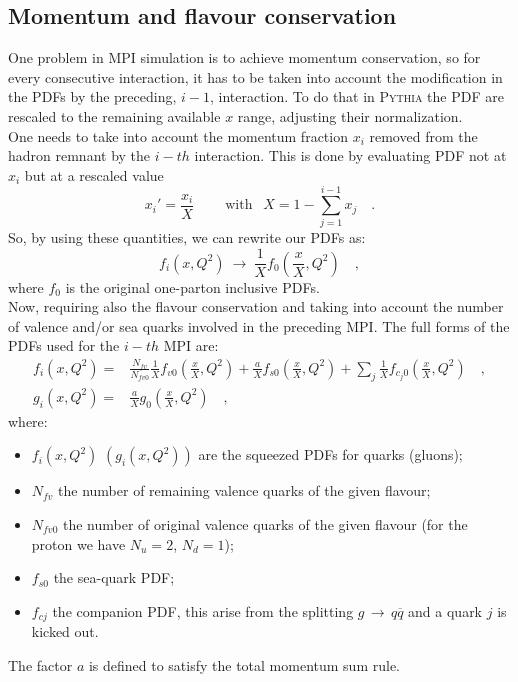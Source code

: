 \subsection{Momentum and flavour conservation}

One problem in MPI simulation is to achieve momentum conservation, so for every consecutive interaction, it has to be taken into account the modification in the PDFs by the preceding, $i-1$, interaction. To do that in \textsc{Pythia} the PDF are rescaled to the remaining available $x$ range, adjusting their normalization.
\\
One needs to take into account the momentum fraction $x_i$ removed from the hadron remnant by the $i-th$ interaction. This is done by evaluating PDF not at $x_i$ but at a rescaled value
\begin{equation}
	x_i'=\frac{x_i}{X} \qquad \ \text{with }\ \ X=1-\sum_{j=1}^{i-1}x_j\quad .
\end{equation}
So, by using these quantities, we can rewrite our PDFs as:
\begin{equation}
	f_i(x,Q^2)\ \longrightarrow\ \frac{1}{X}f_0\left(\frac{x}{X},Q^2\right)\quad ,
\end{equation}
where $f_0$ is the original one-parton inclusive PDFs.
\\
Now, requiring also the flavour conservation and taking into account the number of valence and/or sea quarks involved in the preceding MPI. The full forms of the PDFs used for the $i-th$ MPI are:
\begin{align}
f_i(x,Q^2) =&  \frac{N_{fv}}{N_{fv0}}\frac{1}{X} f_{v0}\left( \frac{x}{X},Q^2 \right) + \frac{a}{X}f_{s0}\left( \frac{x}{X},Q^2 \right)+\displaystyle\sum_j \frac{1}{X} f_{c_j0}\left( \frac{x}{X},Q^2 \right) \quad,\\
g_i(x,Q^2) =& \frac{a}{X}g_0\left( \frac{x}{X},Q^2 \right)\quad, 
\end{align}
where: 
\begin{itemize}
	\item $f_i(x,Q^2)$ $(g_i(x,Q^2))$ are the squeezed PDFs for quarks (gluons);
	\item $N_{fv}$ the number of remaining valence quarks of the given flavour;
	\item $N_{fv0}$ the number of original valence quarks of the given flavour (for the proton we have $N_u=2$, $N_d=1$);
	\item $f_{s0}$ the sea-quark PDF;
	\item $f_{cj}$ the companion PDF, this arise from the splitting $g\,\rightarrow\,q\overline{q}$ and a quark $j$ is kicked out.
\end{itemize}
The factor $a$ is defined to satisfy the total momentum sum rule.

